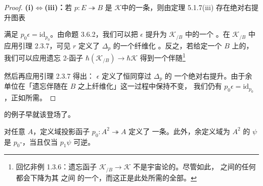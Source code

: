 \begin{proof}
\textbf{(i)$\Leftrightarrow$(iii)：}若 $p\colon E\twoheadrightarrow B$ 是%
\trInfinityCosmos{} $\mathcal{K}$中的一条\trCartesianFibration，则由定理
5.1.7(iii) 存在绝对右提升图表
\begin{center}
\end{center}
满足 $p_{0}\epsilon=\mathrm{id}_{p_{0}}$。由命题 3.6.2，我们可以把 $\epsilon$
提升为\trSliceInfinityCosmos{} $\mathcal{K}_{/B}$ 中的一个%
\trNaturalTransformation。在
$\mathcal{K}_{/B}$ 中应用引理 2.3.7，可见 $r$ 定义了 $\Delta_{p}$ 的一个纤维化%
\trRightAdjoint。反之，若给定一个 $B$ 上的\trFiberedAdjunction，我们可以应用遗忘 2-函子
$\hbar(\mathcal{K}_{/B})\to\hbar\mathcal{K}$ 得到一个伴随\footnote{回忆非例
1.3.6：遗忘函子 $\mathcal{K}_{/B}\to\mathcal{K}$ 不是宇宙论的。尽管如此，%
\trInfinityCosmos{}之间的任何\trSimplicialFunctor{}都会下降为其%
\trHomotopyTwoCategory{}之间
的一个\trTwoFunctor，而这正是此处所需的全部。}
\begin{center}
\end{center}
然后再应用引理 2.3.7 得出：\trCounit{} $\epsilon$ 定义了恒同穿过 $\Delta_{p}$ 的
一个绝对右提升。由于余单位在「遗忘伴随在 $B$ 之上纤维化」这一过程中保持不变，
我们仍有 $p_{0}\epsilon=\mathrm{id}_{p_{0}}$，正如所需。
\end{proof}

\trCartesianFibration{}的例子早就该登场了。

\begin{proposition}[定义域投影纤维化]\label{prop:domain-projection-fibration}
对任意\trInfinityCategory{} $A$，定义域投影函子
$p_{0}\colon A^{2}\twoheadrightarrow A$ 定义了
一条\trCartesianFibration。此外，余定义域为 $A^{2}$ 的\trNaturalTransformation{}
$\psi$ 是 $p_{0}$-\trCartesian，当且仅当 $p_{1}\psi$ 可逆。
\end{proposition}

